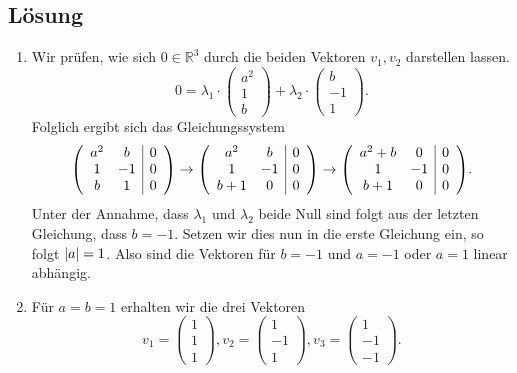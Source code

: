 \documentclass[german,12pt]{homework}
\newcommand{\RR}{\mathbb{R}}
\DeclarePairedDelimiter{\absolute}{\lvert}{\rvert}
\DeclarePairedDelimiter{\enbrace}{(}{)}
\begin{document}
    \subsection*{Lösung}
    \begin{enumerate}
        \item Wir prüfen, wie sich \(0 \in \RR^3\) durch die beiden Vektoren \(v_1, v_2\) darstellen lassen.
        \[0 = \lambda_1 \cdot \begin{pmatrix}a^2\\1\\b\end{pmatrix} + \lambda_2 \cdot \begin{pmatrix}b\\-1\\1\end{pmatrix}.\]
        Folglich ergibt sich das Gleichungssystem
        \[\enbrace*{\begin{array}{cc|c}
            a^2 & b & 0\\
            1 & -1 & 0\\
            b & 1 & 0
        \end{array}} \to \enbrace*{\begin{array}{cc|c}
            a^2 & b & 0\\
            1 & -1 & 0\\
            b + 1 & 0 & 0
        \end{array}} \to \enbrace*{\begin{array}{cc|c}
            a^2 + b & 0 & 0\\
            1 & -1 & 0\\
            b + 1 & 0 & 0
        \end{array}}.\]
        Unter der Annahme, dass \(\lambda_1\) und \(\lambda_2\) beide Null sind folgt aus der letzten Gleichung, dass \(b = -1\). Setzen wir dies nun in die erste Gleichung ein, so folgt \(\absolute*{a} = 1\). Also sind die Vektoren für \(b = -1\) und \(a = -1\) oder \(a = 1\) linear abhängig.
        \item Für \(a = b = 1\) erhalten wir die drei Vektoren
        \[v_1 = \begin{pmatrix}1\\1\\1\end{pmatrix}, v_2 = \begin{pmatrix}1\\-1\\1\end{pmatrix}, v_3 = \begin{pmatrix}1\\-1\\-1\end{pmatrix}.\]

\end{enumerate}
\end{document}
